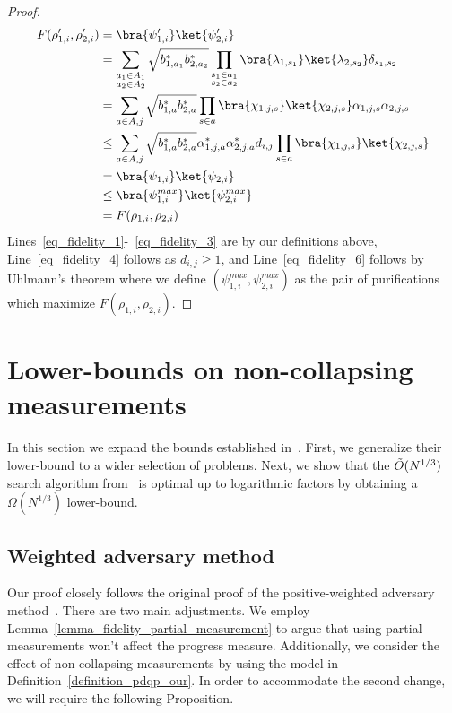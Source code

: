 \documentclass[10pt,a4paper]{article}
\begin{document}
\begin{proof}
\begin{align}
        F(\rho^\prime_{1, i}, \rho^\prime_{2, i}) &= \bra{\psi^\prime_{1,i}}\ket{\psi^\prime_{2,i}} \label{eq_fidelity_1}\\
        &= \sum_{\substack{a_1\in A_1 \\ a_2\in A_2}} \sqrt{b^*_{1,a_1}b^*_{2,a_2}} \prod_{\substack{s_1\in a_1 \\ s_2\in a_2}} \bra{\lambda_{1,s_1}}\ket{\lambda_{2,s_2}} \delta_{s_1,s_2} \\
        &= \sum_{a\in A, j} \sqrt{b^*_{1,a}b^*_{2,a}} \prod_{s\in a} \bra{\chi_{1, j, s}}\ket{\chi_{2,j,s}}\alpha_{1,j,s}\alpha_{2,j,s} \label{eq_fidelity_3}\\
        &\leq \sum_{a\in A, j} \sqrt{b^*_{1,a}b^*_{2,a}} \alpha^*_{1,j,a}\alpha^*_{2,j,a} d_{i,j} \prod_{s\in a} \bra{\chi_{1, j, s}}\ket{\chi_{2,j,s}} \label{eq_fidelity_4}\\
        &= \bra{\psi_{1,i}}\ket{\psi_{2,i}} \label{eq_fidelity_5}\\
        & \leq \bra{\psi^{max}_{1,i}}\ket{\psi^{max}_{2,i}} \label{eq_fidelity_6}\\
        &= F(\rho_{1, i}, \rho_{2, i})
    \end{align}
    Lines~\ref{eq_fidelity_1}-~\ref{eq_fidelity_3} are by our definitions above, Line~\ref{eq_fidelity_4} follows as $d_{i,j}\geq 1$, and Line~\ref{eq_fidelity_6} follows by Uhlmann's theorem where we define $(\psi^{max}_{1,i},\psi^{max}_{2,i})$ as the pair of purifications which maximize $F(\rho_{1,i}, \rho_{2, i})$.
\end{proof}

\section{Lower-bounds on non-collapsing measurements}

In this section we expand the bounds established in~\cite{space_above_bqp}. First, we generalize their lower-bound to a wider selection of problems. Next, we show that the $\Tilde{O}(N^{1/3})$ search algorithm from~\cite{space_above_bqp} is optimal up to logarithmic factors by obtaining a $\Omega(N^{1/3})$ lower-bound.

\subsection{Weighted adversary method}

Our proof closely follows the original proof of the positive-weighted adversary method~\cite{weighted_adversary}. There are two main adjustments. We employ Lemma~\ref{lemma_fidelity_partial_measurement} to argue that using partial measurements won't affect the progress measure. Additionally, we consider the effect of non-collapsing measurements by using the model in Definition~\ref{definition_pdqp_our}. In order to accommodate the second change, we will require the following Proposition.
\end{document}
